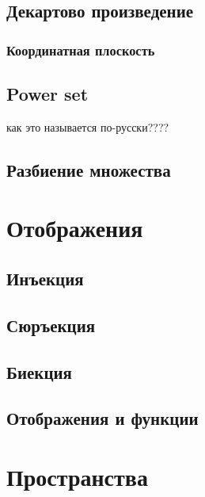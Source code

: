 \documentclass[
  letterpaper,
]{scrbook}
\theoremstyle{definition}
\theoremstyle{remark}
\begin{document}
\subsection{Декартово
произведение}\label{math-settheory-operation-decart}

\subsubsection{Координатная
плоскость}\label{math-settheory-operation-coordplane}

\subsection{Power set}\label{math-settheory-operation-powerset}

как это называется по-русски????

\subsection{Разбиение множества}\label{math-settheory-operation-class}

\section{Отображения}\label{math-settheory-mapping}

\subsection{Инъекция}\label{math-settheory-mapping-injection}

\subsection{Сюръекция}\label{math-settheory-mapping-surjection}

\subsection{Биекция}\label{math-settheory-mapping-bijection}

\subsection{Отображения и
функции}\label{math-settheory-mapping-functions}

\section{Пространства}\label{math-settheory-mapping-spaces}
\end{document}
